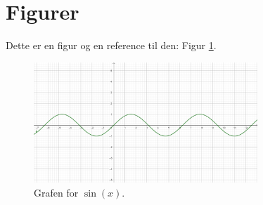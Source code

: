 
\section{Figurer}

Dette er en figur og en reference til den: Figur \ref{fig:sinx}.

\begin{figure}[h]
\label{fig:sinx}
\centering
\includegraphics[width=0.75\textwidth]{billeder/sinx.png}
\caption{Grafen for $\sin(x)$.}
\end{figure}

